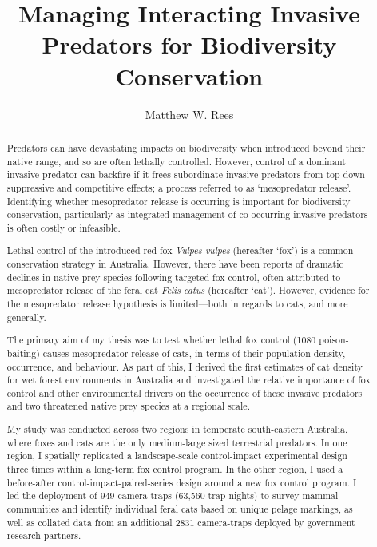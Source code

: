 \documentclass[11pt,a4paper,titlepage,twoside,openright]{style/unimelbthesis}
\title{Managing Interacting Invasive Predators for Biodiversity Conservation}
\author{Matthew W. Rees}
\begin{document}
\begin{frontmatter}


  \maketitle

  \begin{abstract}
    Predators can have devastating impacts on biodiversity when introduced beyond their native range, and so are often lethally controlled. However, control of a dominant invasive predator can backfire if it frees subordinate invasive predators from top-down suppressive and competitive effects; a process referred to as `mesopredator release'. Identifying whether mesopredator release is occurring is important for biodiversity conservation, particularly as integrated management of co-occurring invasive predators is often costly or infeasible.
    
    Lethal control of the introduced red fox \emph{Vulpes vulpes} (hereafter `fox') is a common conservation strategy in Australia. However, there have been reports of dramatic declines in native prey species following targeted fox control, often attributed to mesopredator release of the feral cat \emph{Felis catus} (hereafter `cat'). However, evidence for the mesopredator release hypothesis is limited---both in regards to cats, and more generally.
    
    The primary aim of my thesis was to test whether lethal fox control (1080 poison-baiting) causes mesopredator release of cats, in terms of their population density, occurrence, and behaviour. As part of this, I derived the first estimates of cat density for wet forest environments in Australia and investigated the relative importance of fox control and other environmental drivers on the occurrence of these invasive predators and two threatened native prey species at a regional scale.
    
    My study was conducted across two regions in temperate south-eastern Australia, where foxes and cats are the only medium-large sized terrestrial predators. In one region, I spatially replicated a landscape-scale control-impact experimental design three times within a long-term fox control program. In the other region, I used a before-after control-impact-paired-series design around a new fox control program. I led the deployment of 949 camera-traps (63,560 trap nights) to survey mammal communities and identify individual feral cats based on unique pelage markings, as well as collated data from an additional 2831 camera-traps deployed by government research partners.
    

\end{abstract}
\end{frontmatter}
\end{document}
